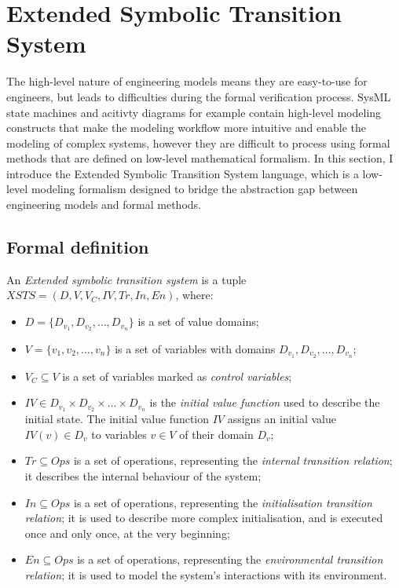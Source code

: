 \section{Extended Symbolic Transition System}\label{sec:xsts}

The high-level nature of engineering models means they are easy-to-use for engineers, but leads to difficulties during the formal verification process. SysML state machines and acitivty diagrams for example contain high-level modeling constructs that make the modeling workflow more intuitive and enable the modeling of complex systems, however they are difficult to process using formal methods that are defined on low-level mathematical formalism. In this section, I introduce the Extended Symbolic Transition System \cite{xsts} language, which is a low-level modeling formalism designed to bridge the abstraction gap between engineering models and formal methods.

\subsection{Formal definition}

\begin{definition}
	
	An \emph{Extended symbolic transition system} is a tuple \( XSTS = (D, V, V_C, IV, Tr, In, En) \), where:
	
	\begin{itemize}
		\item \(D = \{ D_{v_1}, D_{v_2}, \dots, D_{v_n} \} \) is a set of value domains;
		\item \(V = \{ v_1, v_2, \dots, v_n \} \) is a set of variables with domains \(D_{v_1}, D_{v_2}, \dots, D_{v_n}\);
		\item \(V_C \subseteq V\) is a set of variables marked as \emph{control variables};
		\item \(IV \in D_{v_1} \times D_{v_2} \times \dots \times D_{v_n}\) is the \emph{initial value function} used to describe the initial state. The initial value function \(IV\) assigns an initial value \(IV(v) \in D_v\) to variables \(v \in V\) of their domain \(D_v\);
		\item \(Tr \subseteq Ops\) is a set of operations, representing the \emph{internal transition relation}; it describes the internal behaviour of the system;
		\item \(In \subseteq Ops\) is a set of operations, representing the \emph{initialisation transition relation}; it is used to describe more complex initialisation, and is executed once and only once, at the very beginning;
		\item \(En \subseteq Ops\) is a set of operations, representing the \emph{environmental transition relation}; it is used to model the system's interactions with its environment.
	\end{itemize}
\end{definition}\label{def:xsts}

